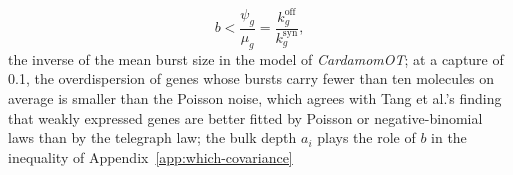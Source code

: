 \begin{itemize}
\begin{itemize}
          \begin{equation}
            b<\frac{\psi_{g}}{\mu_{g}}=\frac{k^{\mathrm{off}}_{g}}{k^{\mathrm{syn}}_{g}},
            \label{eq:dyn-limiting-capture}
          \end{equation}
          the inverse of the mean burst size in the model of \emph{CardamomOT}; at a capture of 0.1, the overdispersion of genes
          whose bursts carry fewer than ten molecules on average is smaller than the Poisson noise, which agrees with Tang
          et al.'s finding that weakly expressed genes are better fitted by Poisson or negative-binomial laws than by the
          telegraph law; the bulk depth \(a_{i}\) plays the role of \(b\) in the inequality of
          Appendix~\ref{app:which-covariance}
  \end{itemize}
\end{itemize}

